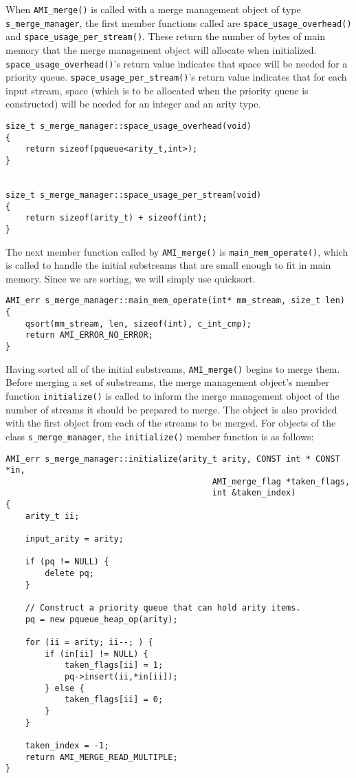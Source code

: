 When \verb|AMI_merge()| is called with a merge management object of
type \verb|s_merge_manager|, the first member functions called are
\verb|space_usage_overhead()| and \verb|space_usage_per_stream()|.
These return the number of bytes of main memory that the merge
management object will allocate when initialized.  
\verb|space_usage_overhead()|'s return value indicates that space will
be needed for a priority
queue.  
\verb|space_usage_per_stream()|'s return value indicates that for each
input stream, space (which is to be allocated when the priority
queue is constructed) will be needed for an integer and an arity type.

\begin{verbatim}
size_t s_merge_manager::space_usage_overhead(void)
{
    return sizeof(pqueue<arity_t,int>);
}


size_t s_merge_manager::space_usage_per_stream(void)
{
    return sizeof(arity_t) + sizeof(int);
}
\end{verbatim}

The next member function called by \verb|AMI_merge()| is
\verb|main_mem_operate()|, which is called to handle the initial
substreams that are small enough to fit in main
memory.  Since we are sorting, we will simply use
quicksort.

\begin{verbatim}
AMI_err s_merge_manager::main_mem_operate(int* mm_stream, size_t len)
{
    qsort(mm_stream, len, sizeof(int), c_int_cmp);
    return AMI_ERROR_NO_ERROR;
}
\end{verbatim}

Having sorted all of the initial substreams, \verb|AMI_merge()| begins
to merge them.  Before merging a set of substreams, the merge
management object's member function \verb|initialize()| is called to
inform the merge management object of the number of streams it should
be prepared to merge.  The object is also provided with the first
object from each of the streams to be merged.  For objects of the
class \verb|s_merge_manager|, the \verb|initialize()| member function
is as follows:

\begin{verbatim}
AMI_err s_merge_manager::initialize(arity_t arity, CONST int * CONST *in,
                                          AMI_merge_flag *taken_flags,
                                          int &taken_index)
{
    arity_t ii;

    input_arity = arity;

    if (pq != NULL) {
        delete pq;
    }

    // Construct a priority queue that can hold arity items.
    pq = new pqueue_heap_op(arity);

    for (ii = arity; ii--; ) {
        if (in[ii] != NULL) {
            taken_flags[ii] = 1;
            pq->insert(ii,*in[ii]);
        } else {
            taken_flags[ii] = 0;
        }
    }

    taken_index = -1;
    return AMI_MERGE_READ_MULTIPLE;
}
\end{verbatim}

